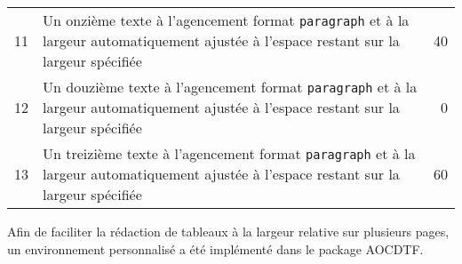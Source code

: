 \documentclass[a4paper, 11pt, twoside, fleqn]{memoir}
\begin{document}
\begin{xltabular}{\linewidth}[t]{c X r}
11		&	Un onzième texte à l'agencement format \texttt{paragraph} et à la largeur automatiquement ajustée à l'espace restant sur la largeur spécifiée	& 40	\\
12		&	Un douzième texte à l'agencement format \texttt{paragraph} et à la largeur automatiquement ajustée à l'espace restant sur la largeur spécifiée	& 0	\\
13		&	Un treizième texte à l'agencement format \texttt{paragraph} et à la largeur automatiquement ajustée à l'espace restant sur la largeur spécifiée	& 60	\\
\end{xltabular}

Afin de faciliter la rédaction de tableaux à la largeur relative sur plusieurs pages, un environnement personnalisé a été implémenté dans le package AOCDTF.  
\end{document}
